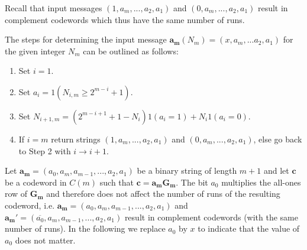 {Recall that input messages $(1,a_m,...,a_2,a_1)$ and
$(0,a_m,...,a_2,a_1)$ result in complement codewords which thus have
the same number of runs.

 The steps for determining the input message $\mathbf{a_m}(N_m)=(x,a_m,...a_2,a_1)$ for the given integer $N_m$ can be
outlined as follows:


\begin{enumerate}
\item Set $i=1$.
\item Set $a_i=1(N_{i,m} \geq 2^{m-i}+1)$.
\item Set $N_{i+1,m}=(2^{m-i+1}+1-N_i)1(a_i=1)+N_i1(a_i=0)$.
\item If $i=m$ return strings $(1,a_m,...,a_2,a_1)$ and $(0,a_m,...,a_2,a_1)$, else go back to
Step 2 with $i \rightarrow i+1$.
\end{enumerate}
} 


Let $\mathbf{a_m}=(a_0,a_m,a_{m-1},...,a_2,a_1)$ be a binary string
of length $m+1$ and let $\mathbf{c}$ be a codeword in $C(m)$ such
that $\mathbf{c}=\mathbf{a_mG_m}$. The bit $a_0$ multiplies the
all-ones row of $\mathbf{G_m}$ and therefore does not affect the
number of runs of the resulting codeword, i.e.
$\mathbf{a_m}=(a_0,a_m,a_{m-1},...,a_2,a_1)$ and
$\mathbf{a_m}'=(\overline{a_0},a_m,a_{m-1},...,a_2,a_1)$ result in
complement codewords (with the same number of runs). In the
following we replace $a_0$ by $x$ to indicate that the value of
$a_0$ does not matter.

